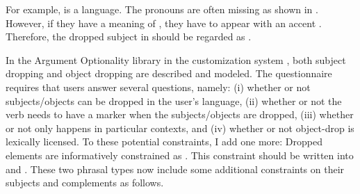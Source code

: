 For example,  is a  language.  The pronouns
are often missing as shown in
. However, if they have a meaning of
, they have to appear with an accent
\citep{cinque:77,lambrecht:96}.  Therefore, the dropped subject in
 should be regarded as
.




In the Argument Optionality library in the customization system
\citep{saleem:10,saleem:bender:10}, both subject dropping and object
dropping are described and modeled.
The questionnaire requires that users answer several questions, namely: (i) whether or not subjects/objects can
be dropped in the user's language, (ii) whether or not the verb needs
to have a marker when the subjects/objects are dropped, (iii) whether
or not  only happens in particular contexts, and (iv)
whether or not object-drop is lexically licensed.  To these potential
constraints, I add one more: Dropped elements are informatively
constrained as . This constraint should be written into
 and .
These two phrasal types now include some additional constraints on
their subjects and complements as follows.





